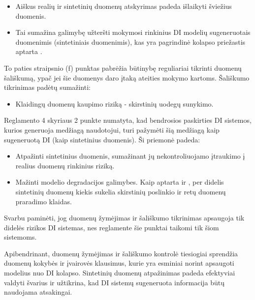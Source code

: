 \documentclass{VUMIFInfKursinis}
\begin{document}
\begin{itemize}
    \item Aiškus realių ir sintetinių duomenų atskyrimas padeda išlaikyti šviežius duomenis.
    \item Tai sumažina galimybę užteršti mokymosi rinkinius DI modelių sugeneruotais duomenimis (sintetiniais duomenimis), kas yra pagrindinė kolapso priežastis aptarta \cite{ModelsGoMAD}.
\end{itemize}

To paties straipsnio (f) punktas pabrėžia būtinybę reguliariai tikrinti duomenų šališkumą, ypač jei šie duomenys daro įtaką ateities mokymo kartoms. Šališkumo tikrinimas padėtų sumažinti:

\begin{itemize}
    \item  Klaidingų duomenų kaupimo riziką - skirstinių uodegų sunykimo.
\end{itemize}

Reglamento 4 skyriaus 2 punkte numatyta, kad bendrosios paskirties DI sistemos, kurios generuoja medžiagą naudotojui, turi pažymėti šią medžiagą kaip sugeneruotą DI (kaip sintetinius duomenis). Ši priemonė padeda:

\begin{itemize}
    \item Atpažinti sintetinius duomenis, sumažinant jų nekontroliuojamo įtraukimo į realius duomenų rinkinius riziką.
    \item Mažinti modelio degradacijos galimybes. Kaip aptarta \cite{AICollapseNature} ir \cite{DesniuPasiulymai}, per didelis sintetinių duomenų kiekis sukelia skirstinių poslinkio ir retų duomenų praradimo klaidas.
\end{itemize}

Svarbu paminėti, jog duomenų žymėjimas ir šališkumo tikrinimas apsaugoja tik didelės rizikos DI sistemas, nes reglamente šie punktai taikomi tik šiom sistemoms. 

Apibendrinant, duomenų žymėjimas ir šališkumo kontrolė tiesiogiai sprendžia duomenų kokybės ir įvairovės klausimus, kurie yra esminiai norint apsaugoti modelius nuo DI kolapso. Sintetinių duomenų atpažinimas padeda efektyviai valdyti švarius ir užtikrina, kad DI sistemų sugeneruota informacija būtų naudojama atsakingai.
\end{document}
